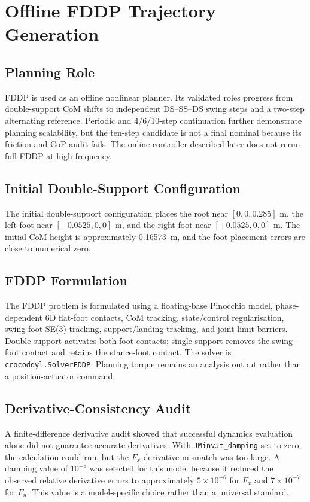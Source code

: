 \documentclass[12pt,a4paper]{report}
\begin{document}
\section{Offline FDDP Trajectory Generation}\label{sec:offline_fddp}
 
\subsection{Planning Role}
FDDP is used as an offline nonlinear planner. Its validated roles progress from double-support CoM shifts to independent DS--SS--DS swing steps and a two-step alternating reference. Periodic and 4/6/10-step continuation further demonstrate planning scalability, but the ten-step candidate is not a final nominal because its friction and CoP audit fails. The online controller described later does not rerun full FDDP at high frequency.
 
\subsection{Initial Double-Support Configuration}
The initial double-support configuration places the root near $[0,0,0.285]$ m, the left foot near $[-0.0525,0,0]$ m, and the right foot near $[+0.0525,0,0]$ m. The initial CoM height is approximately \SI{0.16573}{\metre}, and the foot placement errors are close to numerical zero.
 
\subsection{FDDP Formulation}
The FDDP problem is formulated using a floating-base Pinocchio model, phase-dependent 6D flat-foot contacts, CoM tracking, state/control regularisation, swing-foot SE(3) tracking, support/landing tracking, and joint-limit barriers. Double support activates both foot contacts; single support removes the swing-foot contact and retains the stance-foot contact. The solver is \texttt{crocoddyl.SolverFDDP}. Planning torque remains an analysis output rather than a position-actuator command.
 
\subsection{Derivative-Consistency Audit}
A finite-difference derivative audit showed that successful dynamics evaluation alone did not guarantee accurate derivatives. With \texttt{JMinvJt\_damping} set to zero, the calculation could run, but the $F_x$ derivative mismatch was too large. A damping value of $10^{-8}$ was selected for this model because it reduced the observed relative derivative errors to approximately $5\times 10^{-6}$ for $F_x$ and $7\times 10^{-7}$ for $F_u$. This value is a model-specific choice rather than a universal standard.
 
\end{document}
